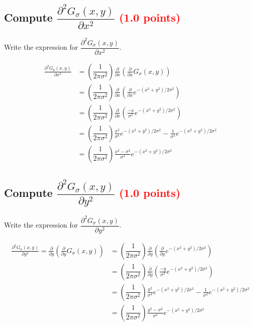 \documentclass[answers]{exam}
\newcommand{\mypoints}[1]{\textcolor{red}{(#1 points)}}
\begin{document}
\subsection{Compute $\dfrac{\partial^2G_{\sigma}(x,y)}{\partial x^2}$ \mypoints{1.0}}
Write the expression for $\dfrac{\partial ^2G_{\sigma}(x,y)}{\partial x^2}$.
\begin{solution}
    $$
    \begin{aligned}
    \frac{\partial^{2} G_{6}(x, y)}{\partial x^{2}} &=(\dfrac{1}{2\pi \sigma^2})\frac{\partial}{\partial x}\left(\frac{\partial}{\partial x} G_{\sigma}(x, y)\right) \\
    &=(\dfrac{1}{2\pi \sigma^2})\frac{\partial}{\partial x}\left(\frac{\partial}{\partial x} e^{-\left(x^{2}+y^{2}\right) / 2 \sigma^{2}}\right) \\
    &=(\dfrac{1}{2\pi \sigma^2})\frac{\partial}{\partial x}\left(\frac{-x}{\sigma^{2}} e^{-\left(x^{2}+y^{2}\right) / 2 \sigma^{2}}\right) \\
    &=(\dfrac{1}{2\pi \sigma^2})\frac{x^{2}}{\sigma^{4}} e^{-\left(x^{2}+y^{2}\right) / 2 \sigma^{2}}-\frac{1}{\sigma^{2}} e^{-\left(x^{2}+y^{2}\right) / 2 \sigma^{2}} \\
    &=(\dfrac{1}{2\pi \sigma^2})\frac{x^{2}-\sigma^{2}}{\sigma^{4}} e^{-\left(x^{2}+y^{2}\right) / 2 \sigma^{2}}
    \end{aligned}
    $$
\end{solution}

\subsection{Compute $\dfrac{\partial^2G_{\sigma}(x,y)}{\partial y^2}$ \mypoints{1.0}}
Write the expression for $\dfrac{\partial^2G_{\sigma}(x,y)}{\partial y^2}$.
\begin{solution}
    $$
    \begin{aligned}
    \frac{\partial^{2} G_{\sigma}(x, y)}{\partial y^{2}} =\frac{\partial}{\partial y}\left(\frac{\partial}{\partial y} G_{\sigma}(x, y)\right) &=(\dfrac{1}{2\pi \sigma^2})\frac{\partial}{\partial y}\left(\frac{\partial}{\partial y} e^{-\left(x^{2}+y^{2}\right) / 2 \sigma^{2}}\right) \\
    &=(\dfrac{1}{2\pi \sigma^2})\frac{\partial}{\partial y}\left(\frac{-y}{\sigma^{2}} e^{-\left(x^{2}+y^{2}\right) / 2 \sigma^{2}}\right) \\
    &=(\dfrac{1}{2\pi \sigma^2})\frac{y^{2}}{\sigma^{4}} e^{-\left(x^{2}+y^{2}\right) / 2 \sigma^{2}}-\frac{1}{\sigma^{2}} e^{-\left(x^{2}+y^{2}\right) / 2 \sigma^{2}} \\
    &=(\dfrac{1}{2\pi \sigma^2})\frac{y^{2}-\sigma^{2}}{\sigma^{4}} e^{-\left(x^{2}+y^{2}\right) / 2 \sigma^{2}}\\
    \end{aligned}
    $$
\end{solution}
\end{document}
